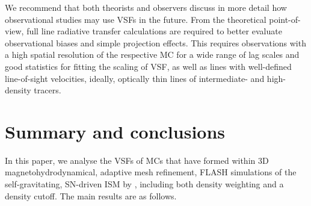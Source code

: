 \documentclass{aa}		%
\begin{document}
We recommend that both theorists and observers discuss in more detail how observational studies may use VSFs in the future.
From the theoretical point-of-view, full line radiative transfer calculations are required to better evaluate observational biases and simple projection effects.
This requires observations with a high spatial resolution of the respective MC for a wide range of lag scales and good statistics for fitting the scaling of VSF, as well as lines with well-defined line-of-sight velocities, ideally, optically thin lines of intermediate- and high-density tracers. 


\section{Summary and conclusions}\label{conclusions}

In this paper, we analyse the VSFs of MCs that have formed within 3D magnetohydrodynamical, adaptive mesh refinement, FLASH simulations of the self-gravitating, SN-driven ISM by , including both density weighting and a density cutoff.
The main results are as follows.
\end{document}

